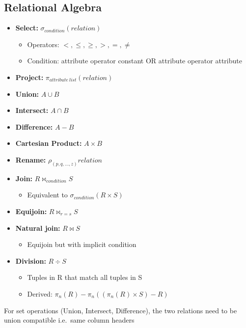 \documentclass[landscape, letterpaper]{extarticle}
\begin{document}
\begin{multicols}{3}
    \section*{Relational Algebra}
    \begin{itemize}[noitemsep,nolistsep]
        \item \textbf{Select: } \( \sigma_{condition}(relation) \)
              \begin{itemize}[noitemsep,nolistsep]
                  \item Operators: \( <, \leq, \geq, >, =, \neq \)
                  \item Condition: attribute operator constant OR attribute operator attribute
              \end{itemize}
        \item \textbf{Project: } \( \pi_{attribute~list}(relation) \)
        \item \textbf{Union:} \( A \cup B \)
        \item \textbf{Intersect:} \( A \cap B \)
        \item \textbf{Difference:} \( A - B\)
        \item \textbf{Cartesian Product:} \( A \times B \)
        \item \textbf{Rename:} \( \rho_{(p, q, \ldots, z)}relation\)
        \item \textbf{Join:} \( R \bowtie_{condition} S\)
              \begin{itemize}[noitemsep,nolistsep]
                  \item Equivalent to \(\sigma_{condition} (R \times S)\)
              \end{itemize}
        \item \textbf{Equijoin:} \( R \bowtie_{r = s} S\)
        \item \textbf{Natural join:} \(R \bowtie S \)
              \begin{itemize}[noitemsep,nolistsep]
                  \item Equijoin but with implicit condition
              \end{itemize}
        \item \textbf{Division:} \(R \div S\)
              \begin{itemize}[noitemsep,nolistsep]
                  \item Tuples in R that match all tuples in S
                  \item Derived: \(\pi_n (R) - \pi_n({({\pi_n(R) \times S}) -R})\)
              \end{itemize}
    \end{itemize}
    For set operations (Union, Intersect, Difference), the two relations need to be union compatible i.e.\ same column headers

\end{multicols}
\end{document}
